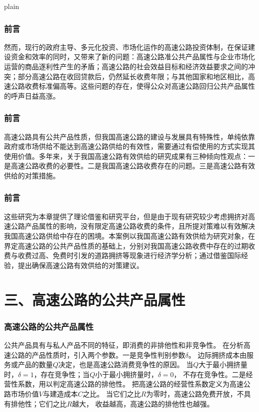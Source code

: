 \documentclass[aspectratio=169, 12pt]{beamer}
\begin{document}
\begin{frame}{plain}
    \frametitle{前言}
    然而，现行的政府主导、多元化投资、市场化运作的高速公路投资体制，在保证建设资金和效率的同时，又带来了新的问题：高速公路准公共产品属性与企业市场化运营的商品逐利性产生的矛盾；高速公路的社会效益目标和经济效益要求之间的冲突；部分高速公路在收回贷款后，仍然延长收费年限；与其他国家和地区相比，高速公路收费标准偏高等。这些问题的存在，使得公众对高速公路回归公共产品属性的呼声日益高涨。
\end{frame}

\begin{frame}[plain]
    \frametitle{前言}
    高速公路具有公共产品性质，但我国高速公路的建设与发展具有特殊性，单纯依靠政府或市场供给不能达到高速公路供给的有效性，需要通过有偿使用的方式实现其使用价值。多年来，关于我国高速公路有效供给的研究成果有三种倾向性观点：一是高速公路收费的必要性。二是我国高速公路收费存在的问题。三是高速公路有效供给的对策措施。
\end{frame}

\begin{frame}[plain]
    \frametitle{前言}
    这些研究为本章提供了理论借鉴和研究平台，但是由于现有研究较少考虑拥挤对高速公路产品属性的影响，没有限定高速公路收费的条件，且所提对策难以有效解决我国高速公路供给中存在的困境。本案例以我国高速公路有效供给为研究对象，在界定高速公路的公共产品性质的基础上，分别对我国高速公路收费中存在的过期收费与收费过高、免费时引发的道路拥挤等现象进行经济学分析；通过借鉴国际经验，提出确保高速公路有效供给的对策建议。
\end{frame}

\section{三、高速公路的公共产品属性}

\begin{frame}[plain]
    \frametitle{高速公路的公共产品属性}
    公共产品具有与私人产品不同的特征，即消费的非排他性和非竞争性。
    在分析高速公路的产品性质时，引入两个参数。一是竞争性判别参数$\delta $。
    边际拥挤成本由服务或产品的数量$Q$决定，也是高速公路消费竞争性的原因。
    当$Q$大于最小拥挤量时，$\delta =1$，存在竞争性；当$Q$小于最小拥挤量时，$\delta =0$，
    不存在竞争性。二是经营性系数，用以判定高速公路的排他性。
    把高速公路的经营性系数定义为高速公路市场价值$V$与建造成本$C$之比。
    当它们之比$R$为零时，高速公路免费开放，不具有排他性；它们之比$R$越大，
    收益越高，高速公路的排他性也越强。
\end{frame}
\end{document}
